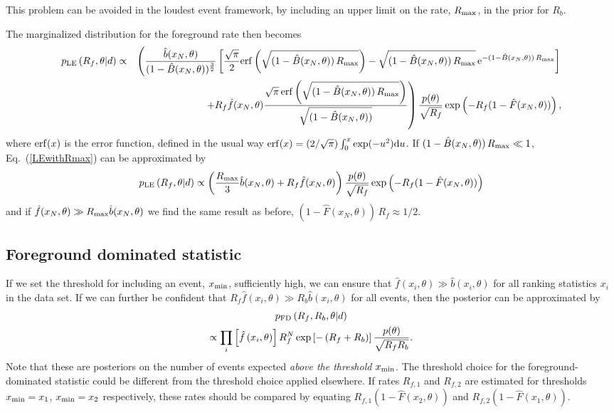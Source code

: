 \documentclass[aps,prd,reprint,nofootinbib]{revtex4-1}
\begin{document}
This problem can be avoided in the loudest event framework, by
including an upper limit on the rate, $R_{\rm max}$, in the prior for
$R_b$. 
\begin{widetext}
The marginalized distribution for the foreground rate then becomes
\begin{eqnarray}
p_{\rm LE}\left( R_f, \theta | d \right) &\propto& \left(
\frac{\hat{b}(x_N,\theta)}{(1-\hat{B}(x_N,\theta))^{\frac{3}{2}}}
\left[\frac{\sqrt{\pi}}{2}{\rm
    erf}\left(\sqrt{(1-\hat{B}(x_N,\theta))\,R_{\rm max}}\right) -
  \sqrt{(1-\hat{B}(x_N,\theta))\,R_{\rm max}} \, {\rm
    e}^{-(1-\hat{B}(x_N,\theta)) \, R_{\rm max}}\right]
\right. \nonumber \\ && \left.+ R_f
\hat{f}(x_N,\theta)\frac{\sqrt{\pi}\,{\rm
    erf}\left(\sqrt{(1-\hat{B}(x_N,\theta))\,R_{\rm
      max}}\right)}{\sqrt{(1-\hat{B}(x_N,\theta))}}\right)\frac{p(\theta)}{\sqrt{R_f}}
\exp\left(-R_f(1-\hat{F}(x_N,\theta))\right) \label{LEwithRmax},
\end{eqnarray}
where ${\rm erf}(x)$ is the error function, defined in the usual way
${\rm erf}(x) = (2/\sqrt{\pi}) \int_0^x \exp(-u^2){\rm d}u$. If
$(1-\hat{B}(x_N,\theta)) \, R_{\rm max} \ll 1$, Eq.~(\ref{LEwithRmax})
can be approximated by
\begin{equation}
p_{\rm LE}\left( R_f, \theta | d \right) \propto \left( \frac{R_{\rm
    max}}{3} \hat{b}(x_N,\theta) + R_f
\hat{f}(x_N,\theta)\right)\frac{p(\theta)}{\sqrt{R_f}}
\exp\left(-R_f(1-\hat{F}(x_N,\theta))\right)
\end{equation}
and if $\hat{f}(x_N,\theta) \gg R_{\rm max} \hat{b}(x_N,\theta)$ we
find the same result as before, $(1- \hat{F}(x_N,\theta))\,R_f \approx
1/2$.
\end{widetext}

\subsection{Foreground dominated statistic}
If we set the threshold for including an event, $x_{\rm min}$,
sufficiently high, we can ensure that $\hat{f}(x_i,\theta) \gg
\hat{b}(x_i,\theta)$ for all ranking statistics $x_i$ in the data
set.  If we can further be confident that $R_f \hat{f}(x_i,\theta) \gg R_b \hat{b}(x_i,\theta)$ for all events, then the posterior can be approximated by
\begin{multline}
p_{\rm FD}\left( R_f, R_b, \theta | d \right) \\ \propto \prod_{i} \left[
  \hat{f}\left(x_i, \theta\right)\right] R_f^N \exp\left[-\left( R_f +
  R_b \right) \right] \frac{p(\theta)}{\sqrt{R_f R_b}}.
\end{multline}
Note that these are posteriors on the number of events expected \emph{above the
threshold $x_{\rm min}$}.  The threshold choice for the foreground-dominated statistic could be different from the threshold choice applied elsewhere.  If rates $R_{f,1}$ and $R_{f,2}$ are estimated for thresholds $x_{\rm min}=x_1$, $x_{\rm min}=x_2$ respectively, these rates should be compared by equating $R_{f,1} (1-\hat{F}(x_2,\theta))$ and $R_{f,2} (1-\hat{F}(x_1,\theta))$.
\end{document}
